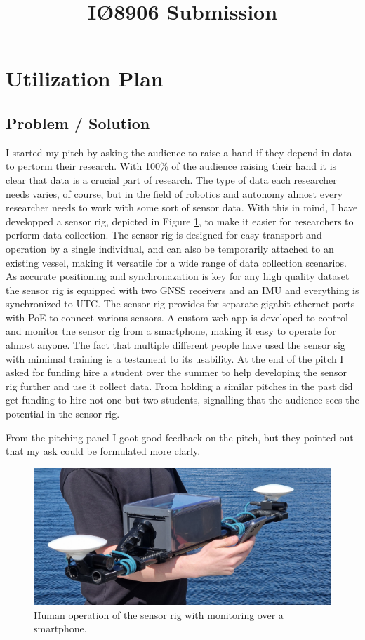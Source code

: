 \documentclass{iopconfser}
\begin{document}
\title{IØ8906 Submission}

\section*{Utilization Plan}
\subsection*{Problem / Solution}
I started my pitch by asking the audience to raise a hand if they depend in data to pertorm their research.
With 100\% of the audience raising their hand it is clear that data is a crucial part of research.
The type of data each researcher needs varies, of course, but in the field of robotics and autonomy almost every researcher needs to work with some sort of sensor data.
With this in mind, I have developped a sensor rig, depicted in Figure \ref{fig:operation}, to make it easier for researchers to perform data collection.
The sensor rig is designed for easy transport and operation by a single individual, and can also be temporarily attached to an existing vessel, making it versatile for a wide range of data collection scenarios.
As accurate positioning and synchronazation is key for any high quality dataset the sensor rig is equipped with two GNSS receivers and an IMU and everything is synchronized to UTC.
The sensor rig provides for separate gigabit ethernet ports with PoE to connect various sensors.
A custom web app is developed to control and monitor the sensor rig from a smartphone, making it easy to operate for almost anyone.
The fact that multiple different people have used the sensor sig with mimimal training is a testament to its usability.
At the end of the pitch I asked for funding hire a student over the summer to help developing the sensor rig further and use it collect data.
From holding a similar pitches in the past did get funding to hire not one but two students, signalling that the audience sees the potential in the sensor rig.

From the pitching panel I goot good feedback on the pitch, but they pointed out that my ask could be formulated more clarly.


\begin{figure}[H]
    \centering
    \includegraphics[trim={0 1cm 0 1cm},clip,width=\textwidth]{figures/operation.jpg}
    \caption{Human operation of the sensor rig with monitoring over a smartphone. \label{fig:operation}}
\end{figure}
\end{document}
